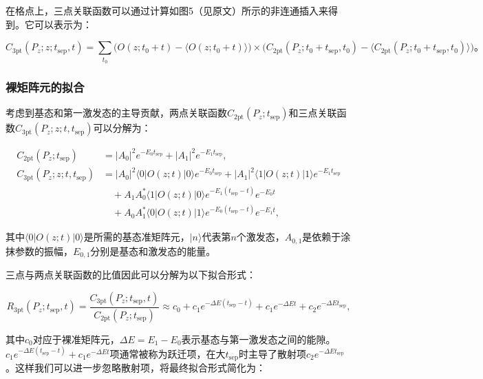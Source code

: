 \documentclass[12pt,a4paper]{ctexart}
\begin{document}
在格点上，三点关联函数可以通过计算如图5（见原文）所示的非连通插入来得到。它可以表示为：

\begin{equation}
C_{\text{3pt}}(P_z; z; t_{\text{sep}}, t) = \sum_{t_0} \bigl(O(z; t_0 + t) - \langle O(z; t_0 + t) \rangle\bigr) \times \bigl(C_{\text{2pt}}(P_z; t_0 + t_{\text{sep}}, t_0) - \langle C_{\text{2pt}}(P_z; t_0 + t_{\text{sep}}, t_0) \rangle\bigr)。
\label{eq:3pt_disconnected}
\end{equation}

\subsubsection*{裸矩阵元的拟合}

考虑到基态和第一激发态的主导贡献，两点关联函数$C_{\text{2pt}}(P_z; t_{\text{sep}})$和三点关联函数$C_{\text{3pt}}(P_z; z; t, t_{\text{sep}})$可以分解为：

\begin{equation}
\begin{aligned}
C_{\text{2pt}}(P_z; t_{\text{sep}}) &= |A_0|^2 e^{-E_0 t_{\text{sep}}} + |A_1|^2 e^{-E_1 t_{\text{sep}}}, \\
C_{\text{3pt}}(P_z; z; t, t_{\text{sep}}) &= |A_0|^2 \langle 0|O(z; t)|0\rangle e^{-E_0 t_{\text{sep}}} + |A_1|^2 \langle 1|O(z; t)|1\rangle e^{-E_1 t_{\text{sep}}} \\
&\quad + A_1 A^*_0 \langle 1|O(z; t)|0\rangle e^{-E_1(t_{\text{sep}}-t)} e^{-E_0 t} \\
&\quad + A_0 A^*_1 \langle 0|O(z; t)|1\rangle e^{-E_0(t_{\text{sep}}-t)} e^{-E_1 t},
\end{aligned}
\label{eq:decomposition}
\end{equation}

其中$\langle 0|O(z; t)|0\rangle$是所需的基态准矩阵元，$|n\rangle$代表第$n$个激发态，$A_{0,1}$是依赖于涂抹参数的振幅，$E_{0,1}$分别是基态和激发态的能量。

三点与两点关联函数的比值因此可以分解为以下拟合形式：

\begin{equation}
R_{\text{3pt}}(P_z; t_{\text{sep}}, t) = \frac{C_{\text{3pt}}(P_z; t_{\text{sep}}, t)}{C_{\text{2pt}}(P_z; t_{\text{sep}})} \approx c_0 + c_1 e^{-\Delta E (t_{\text{sep}}-t)} + c_1 e^{-\Delta E t} + c_2 e^{-\Delta E t_{\text{sep}}},
\label{eq:ratio_fit}
\end{equation}

其中$c_0$对应于裸准矩阵元，$\Delta E = E_1 - E_0$表示基态与第一激发态之间的能隙。$c_1 e^{-\Delta E (t_{\text{sep}}-t)} + c_1 e^{-\Delta E t}$项通常被称为跃迁项，在大$t_{\text{sep}}$时主导了散射项$c_2 e^{-\Delta E t_{\text{sep}}}$。这样我们可以进一步忽略散射项，将最终拟合形式简化为：
\end{document}
